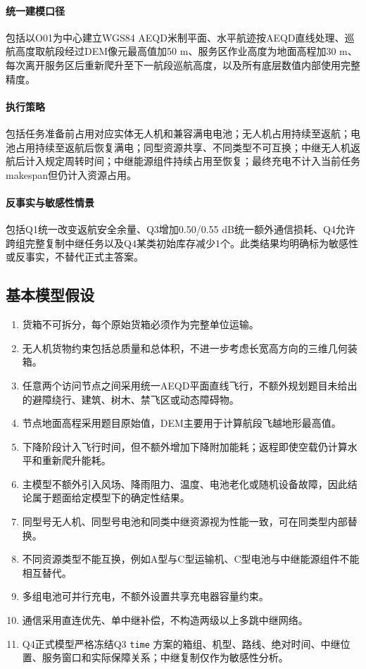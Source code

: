 \documentclass[UTF8,a4paper,12pt]{ctexart}
\begin{document}
\paragraph{统一建模口径}
包括以O01为中心建立WGS84 AEQD米制平面、水平航迹按AEQD直线处理、巡航高度取航段经过DEM像元最高值加50 m、服务区作业高度为地面高程加30 m、每次离开服务区后重新爬升至下一航段巡航高度，以及所有底层数值内部使用完整精度。

\paragraph{执行策略}
包括任务准备前占用对应实体无人机和兼容满电电池；无人机占用持续至返航；电池占用持续至返航后恢复满电；同型资源共享、不同类型不可互换；中继无人机返航后计入规定周转时间；中继能源组件持续占用至恢复；最终充电不计入当前任务makespan但仍计入资源占用。

\paragraph{反事实与敏感性情景}
包括Q1统一改变返航安全余量、Q3增加0.50/0.55 dB统一额外通信损耗、Q4允许跨组完整复制中继任务以及Q4某类初始库存减少1个。此类结果均明确标为敏感性或反事实，不替代正式主答案。

\subsection{基本模型假设}

\begin{enumerate}[label=\textbf{假设\arabic*.},leftmargin=3.5em]
\item 货箱不可拆分，每个原始货箱必须作为完整单位运输。
\item 无人机货物约束包括总质量和总体积，不进一步考虑长宽高方向的三维几何装箱。
\item 任意两个访问节点之间采用统一AEQD平面直线飞行，不额外规划题目未给出的避障绕行、建筑、树木、禁飞区或动态障碍物。
\item 节点地面高程采用题目原始值，DEM主要用于计算航段飞越地形最高值。
\item 下降阶段计入飞行时间，但不额外增加下降附加能耗；返程即使空载仍计算水平和重新爬升能耗。
\item 主模型不额外引入风场、降雨阻力、温度、电池老化或随机设备故障，因此结论属于题面给定模型下的确定性结果。
\item 同型号无人机、同型号电池和同类中继资源视为性能一致，可在同类型内部替换。
\item 不同资源类型不能互换，例如A型与C型运输机、C型电池与中继能源组件不能相互替代。
\item 多组电池可并行充电，不额外设置共享充电器容量约束。
\item 通信采用直连优先、单中继补偿，不构造两级以上多跳中继网络。
\item Q4正式模型严格冻结Q3 \texttt{time} 方案的箱组、机型、路线、绝对时间、中继位置、服务窗口和实际保障关系；中继复制仅作为敏感性分析。
\end{enumerate}
\end{document}
